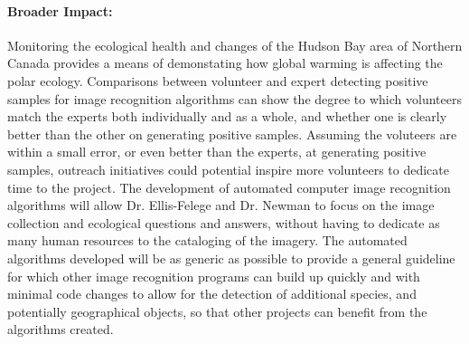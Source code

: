 \documentclass[11pt]{article}
\begin{document}
\paragraph{Broader Impact:} \hspace{-5mm} Monitoring the ecological health and changes of the Hudson Bay area of Northern Canada provides a means of demonstating how global warming is affecting the polar ecology.  Comparisons between volunteer and expert detecting positive samples for image recognition algorithms can show the degree to which volunteers match the experts both individually and as a whole, and whether one is clearly better than the other on generating positive
samples. Assuming the voluteers are within a small error, or even better than the experts, at generating positive samples, outreach initiatives could potential inspire more volunteers to dedicate time to the project. The development of automated computer image recognition algorithms will allow Dr. Ellis-Felege and Dr. Newman to focus on the image collection and ecological questions and answers, without having to dedicate as many human resources to the cataloging of the imagery. The automated algorithms developed will be as generic as possible to provide a general guideline for which other image recognition programs can build up quickly and with minimal code changes to allow for the detection
of additional species, and potentially geographical objects, so that other projects can benefit from the algorithms created.
\end{document}
